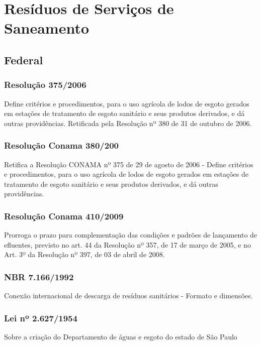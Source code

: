 \section{Resíduos de Serviços de Saneamento}

\begin{subapend}
	\subsection{Federal}
	\begin{subsubapend}
		\subsubsection{Resolução 375/2006}
		Define critérios e procedimentos, para o uso agrícola de lodos de esgoto gerados em estações de tratamento de esgoto sanitário e seus produtos derivados, e dá outras providências. Retificada pela Resolução nº 380 de 31 de outubro de 2006.
		\subsubsection{Resolução Conama 380/200}
		Retifica a Resolução CONAMA nº 375 de 29 de agosto de 2006 - Define critérios e procedimentos, para o uso agrícola de lodos de esgoto gerados em estações de tratamento de esgoto sanitário e seus produtos derivados, e dá outras providências.
		\subsubsection{Resolução Conama 410/2009}
		Prorroga o prazo para complementação das condições e padrões de lançamento de efluentes, previsto no art. 44 da Resolução nº 357, de 17 de março de 2005, e no Art. 3º da Resolução nº 397, de 03 de abril de 2008.
		\subsubsection{NBR 7.166/1992}
		Conexão internacional de descarga de resíduos sanitários - Formato e dimensões.
		\subsubsection{Lei nº 2.627/1954}
		Sobre a criação do Departamento de águas e esgoto do estado de São Paulo
	\end{subsubapend}
\end{subapend}

